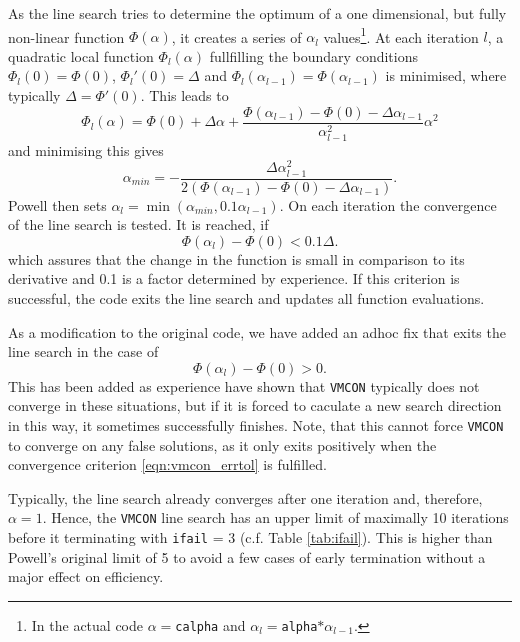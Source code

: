 \documentclass[11pt,a4paper]{report}
\newcommand{\ifail}{\mbox{\texttt{ifail}}}
\newcommand{\vmcon}{\mbox{\texttt{VMCON}}}
\begin{document}
As the line search tries to determine the optimum of a one dimensional, but
fully non-linear function $\Phi(\alpha)$, it creates a series of $\alpha_l$
values\footnote{In the actual code $\alpha=$\texttt{calpha} and $\alpha_l
  =$\texttt{alpha}$*\alpha_{l-1}$.}. At each iteration $l$, a quadratic local
function $\Phi_l(\alpha)$ fullfilling the boundary conditions $\Phi_l(0) =
\Phi(0)$, $\Phi_l'(0)=\Delta$ and $\Phi_l(\alpha_{l-1}) = \Phi(\alpha_{l-1})$
is minimised, where typically
$\Delta=\Phi'(0)$. %
This leads to
\begin{equation}
\Phi_l(\alpha) = \Phi(0) + \Delta \alpha + \frac{\Phi(\alpha_{l-1})-\Phi(0) -
  \Delta \alpha_{l-1}}{\alpha_{l-1}^2} \alpha^2
\end{equation}
and minimising this gives 
\begin{equation}
\alpha_{min} = - \frac{\Delta\alpha_{l-1}^2}{2(\Phi(\alpha_{l-1})-\Phi(0) -
  \Delta \alpha_{l-1})}.
\end{equation}
Powell then sets $\alpha_l = \min(\alpha_{min}, 0.1\alpha_{l-1})$. On each
iteration the convergence of the line search is tested. It is reached, if
\begin{equation}
\Phi(\alpha_l) - \Phi(0) < 0.1 \Delta.
\end{equation}
which assures that the change in the function is small in comparison to its
derivative and 0.1 is a factor determined by experience. If this criterion is
successful, the code exits the line search and updates all function
evaluations.

As a modification to the original code, we have added an adhoc fix that exits
the line search in the case of
\begin{equation}
\Phi(\alpha_l) - \Phi(0) > 0.
\end{equation}
This has been added as experience have shown that \vmcon\/ typically does not
converge in these situations, but if it is forced to caculate a new search
direction in this way, it sometimes successfully finishes. Note, that this
cannot force \vmcon\/ to converge on any false solutions, as it only exits
positively when the convergence criterion \ref{eqn:vmcon_errtol} is fulfilled.

Typically, the line search already converges after one iteration and,
therefore, $\alpha = 1$. Hence, the \vmcon\/ line search has an upper limit of
maximally 10 iterations before it terminating with \ifail\/ = 3 (c.f. Table
\ref{tab:ifail}). This is higher than Powell's original limit of 5 to avoid a
few cases of early termination without a major effect on efficiency.
\end{document}
